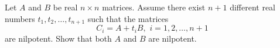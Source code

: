 Let \(A\) and \(B\) be real \(n\times n \) matrices. Assume there exist \(n+1\) different real numbers \(t_{1},t_{2},\dots,t_{n+1}\) such that the matrices
\[C_{i}=A+t_{i}B, \,\,    i=1,2,\dots,n+1\]are nilpotent. Show that both \(A\) and \(B\) are nilpotent.